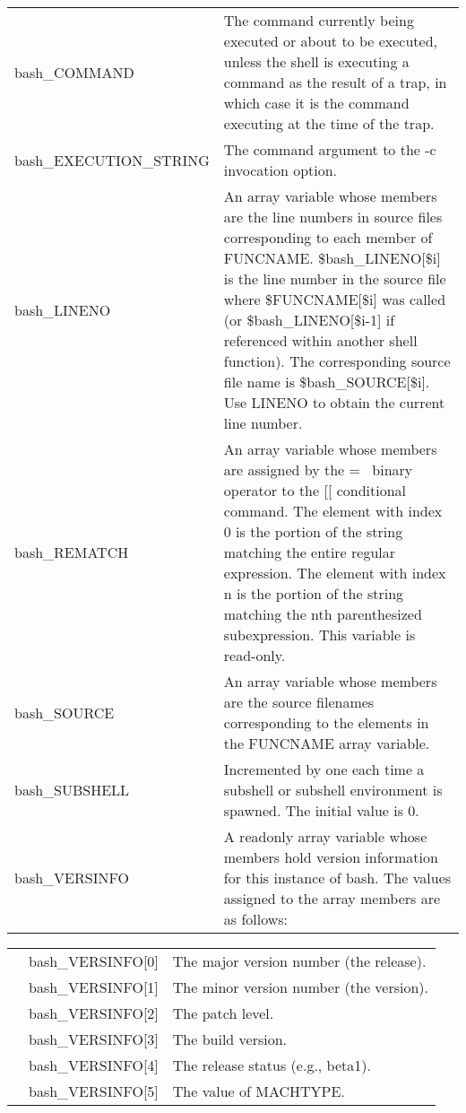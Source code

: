 \documentclass[11pt]{article}
\begin{document}
\begin{longtable}{p{}p{}}
bash\_COMMAND &
The command currently being executed or about to be executed, unless the shell is executing a command as the result of a trap, in which case it is the command executing at the time of the trap. \\

bash\_EXECUTION\_STRING &
The command argument to the -c invocation option. \\

bash\_LINENO &
An array variable whose members are the line numbers in source files corresponding to each member of FUNCNAME. \${bash\_LINENO[\$i]} is the line number in the source file where \${FUNCNAME[\$i]} was called (or \${bash\_LINENO[\$i-1]} if referenced within another shell function). The corresponding source file name is \${bash\_SOURCE[\$i]}. Use LINENO to obtain the current line number. \\

bash\_REMATCH &
An array variable whose members are assigned by the =~ binary operator to the [[ conditional command. The element with index 0 is the portion of the string matching the entire regular expression. The element with index n is the portion of the string matching the nth parenthesized subexpression. This variable is read-only. \\

bash\_SOURCE &
An array variable whose members are the source filenames corresponding to the elements in the FUNCNAME array variable. \\

bash\_SUBSHELL &
Incremented by one each time a subshell or subshell environment is spawned. The initial value is 0. \\

bash\_VERSINFO &
A readonly array variable whose members hold version information for this instance of bash. The values assigned to the array members are as follows:
\end{longtable}

\begin{longtable}{p{}p{}p{}}

 & bash\_VERSINFO[0] &
The major version number (the release). \\

 & bash\_VERSINFO[1] &

The minor version number (the version). \\

 & bash\_VERSINFO[2] &

The patch level. \\

 & bash\_VERSINFO[3] &

The build version. \\

 & bash\_VERSINFO[4] &

The release status (e.g., beta1). \\

 & bash\_VERSINFO[5] &

The value of MACHTYPE. \\
\end{longtable}
\end{document}
